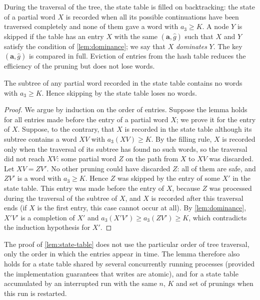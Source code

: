During the traversal of the tree, the state table is filled on backtracking: the state of a partial word $X$ is recorded when all its possible continuations have been traversed completely and none of them gave a word with $a_3\ge K$.
A node $Y$ is skipped if the table has an entry $X$ with the same $(\mathbf a,\widehat g)$ such that $X$ and $Y$ satisfy the condition of \cref{lem:dominance}; we say that $X$ \emph{dominates} $Y$.
The key $(\mathbf a,\widehat g)$ is compared in full. Eviction of entries from the hash table reduces the efficiency of the pruning but does not lose words.

\begin{lemma}\label{lem:state-table}
The subtree of any partial word recorded in the state table contains no words with $a_3\ge K$.
Hence skipping by the state table loses no words.
\end{lemma}

\begin{proof}
We argue by induction on the order of entries. Suppose the lemma holds for all entries made before the entry of a partial word $X$; we prove it for the entry of $X$.
Suppose, to the contrary, that $X$ is recorded in the state table although its subtree contains a word $XV$ with $a_3(XV)\ge K$.
By the filling rule, $X$ is recorded only when the traversal of its subtree has found no such words, so the traversal did not reach $XV$: some partial word $Z$ on the path from $X$ to $XV$ was discarded.
Let $XV=ZV'$.
No other pruning could have discarded $Z$: all of them are safe, and $ZV'$ is a word with $a_3\ge K$.
Hence $Z$ was skipped by the entry of some $X'$ in the state table.
This entry was made before the entry of $X$, because $Z$ was processed during the traversal of the subtree of $X$, and $X$ is recorded after this traversal ends (if $X$ is the first entry, this case cannot occur at all).
By \cref{lem:dominance}, $X'V'$ is a completion of $X'$ and $a_3(X'V')\ge a_3(ZV')\ge K$, which contradicts the induction hypothesis for $X'$.
\end{proof}

\begin{remark}\label{rem:shared-table}
The proof of \cref{lem:state-table} does not use the particular order of tree traversal, only the order in which the entries appear in time. The lemma therefore also holds for a state table shared by several concurrently running processes (provided the implementation guarantees that writes are atomic), and for a state table accumulated by an interrupted run with the same $n$, $K$ and set of prunings when this run is restarted.
\end{remark}

